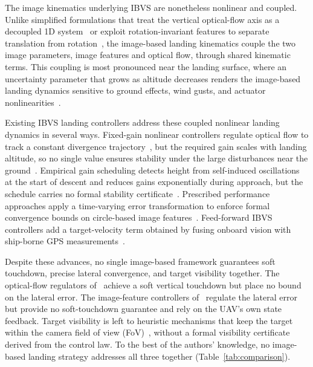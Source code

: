 \documentclass{IEEEtaes}
\begin{document}
The image kinematics underlying IBVS are nonetheless nonlinear and coupled. Unlike simplified formulations that treat the vertical optical-flow axis as a decoupled 1D system~\cite{herisse2012} or exploit rotation-invariant features to separate translation from rotation~\cite{lin2023}, the image-based landing kinematics couple the two image parameters, image features and optical flow, through shared kinematic terms. This coupling is most pronounced near the landing surface, where an uncertainty parameter that grows as altitude decreases renders the image-based landing dynamics sensitive to ground effects, wind gusts, and actuator nonlinearities~\cite{herisse2012,ho2018}.

Existing IBVS landing controllers address these coupled nonlinear landing dynamics in several ways. Fixed-gain nonlinear controllers regulate optical flow to track a constant divergence trajectory~\cite{herisse2012}, but the required gain scales with landing altitude, so no single value ensures stability under the large disturbances near the ground~\cite{ho2018}. Empirical gain scheduling detects height from self-induced oscillations at the start of descent and reduces gains exponentially during approach, but the schedule carries no formal stability certificate~\cite{ho2018}. Prescribed performance approaches apply a time-varying error transformation to enforce formal convergence bounds on circle-based image features~\cite{lin2023}. Feed-forward IBVS controllers add a target-velocity term obtained by fusing onboard vision with ship-borne GPS measurements~\cite{cho2022}.

Despite these advances, no single image-based framework guarantees soft touchdown, precise lateral convergence, and target visibility together. The optical-flow regulators of~\cite{herisse2012,ho2018} achieve a soft vertical touchdown but place no bound on the lateral error. The image-feature controllers of~\cite{lin2023,cho2022} regulate the lateral error but provide no soft-touchdown guarantee and rely on the UAV's own state feedback. Target visibility is left to heuristic mechanisms that keep the target within the camera field of view (FoV)~\cite{cho2022,angelis2026}, without a formal visibility certificate derived from the control law. To the best of the authors' knowledge, no image-based landing strategy addresses all three together (Table~\ref{tab:comparison}).
\end{document}
